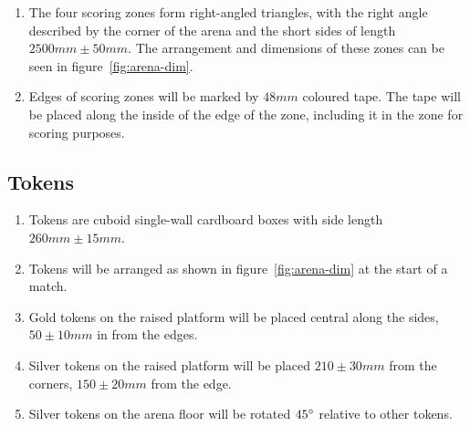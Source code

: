 \begin{enumerate}
\item The four scoring zones form right-angled triangles, with the right angle described by the corner of the arena and the short sides of length $2500mm \pm 50mm$.
      The arrangement and dimensions of these zones can be seen in figure~\ref{fig:arena-dim}.

\item Edges of scoring zones will be marked by $48mm$ coloured tape.
      The tape will be placed along the inside of the edge of the zone, including it in the zone for scoring purposes.
\end{enumerate}

\subsection{Tokens}
\label{sub:Tokens}
\begin{enumerate}
\item Tokens are cuboid single-wall cardboard boxes with side length $260mm \pm 15mm$.

\item Tokens will be arranged as shown in figure~\ref{fig:arena-dim} at the start of a match.

\item Gold tokens on the raised platform will be placed central along the sides,  $50 \pm 10 mm$ in from the edges.

\item Silver tokens on the raised platform will be placed $210 \pm 30 mm$ from the corners, $150 \pm 20 mm$ from the edge.

\item Silver tokens on the arena floor will be rotated $45\degree$ relative to other tokens.

\end{enumerate}

\clearpage
